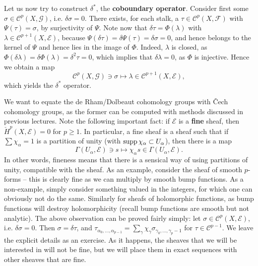 \documentclass{../mathnotes}
\begin{document}
Let us now try to construct $\delta^*$, the \textbf{coboundary operator}.
Consider first some $\sigma\in\mathcal{C}^p(X,\mathcal{G})$, i.e. $\delta\sigma=0$.
There exists, for each stalk, a $\tau\in \mathcal{C}^p(X,\mathcal{F})$ with $\Psi(\tau)=\sigma$,
by surjectivity of $\Psi$. Note now that $\delta\tau=\Phi(\lambda)$ with $\lambda\in\mathcal{C}^{p+1}(X,\mathcal{E})$,
because $\Psi(\delta\tau)=\delta\Psi(\tau)=\delta\sigma=0$, and hence belongs to the kernel of $\Psi$ and
hence lies in the image of $\Phi$. Indeed, $\lambda$ is closed, as $\Phi(\delta\lambda)=\delta\Phi(\lambda)=\delta^2\tau=0$,
which implies that $\delta\lambda=0$, as $\Phi$ is injective. Hence we obtain a map
\[\mathcal{C}^p(X,\mathcal{G})\ni\sigma\mapsto\lambda\in\mathcal{C}^{p+1}(X,\mathcal{E}),\]
which yields the $\delta^*$ operator.

We want to equate the de Rham/Dolbeaut cohomology groups with \v{C}ech cohomology groups, as the former
can be computed with methods discussed in previous lectures. Note the following important fact:
if $\mathcal{E}$ is a \textbf{fine} sheaf, then $\check H^p(X,\mathcal{E})=0$ for $p\geq 1$. In particular,
a fine sheaf is a sheaf such that if $\sum\chi_\alpha=1$ is a partition of unity (with $\operatorname{supp}\chi_\alpha\subset U_\alpha$),
then there is a map
\[\Gamma(U_\alpha,\mathcal{E})\ni s\mapsto \chi_\alpha s\in\Gamma(U_\alpha,\mathcal{E}).\]
In other words, fineness means that there is a sensical way of using partitions of unity,
compatible with the sheaf. As an example, consider the sheaf of smooth $p$-forms -- this is clearly fine
as we can multiply by smooth bump functions. As a non-example, simply consider something valued in the integers,
for which one can obviously not do the same. Similarly for sheafs of holomorphic functions, as
bump functions will destroy holomorphicity (recall bump functions are smooth but not analytic).
The above observation can be proved fairly simply: let $\sigma\in\mathcal{C}^p(X,\mathcal{E})$, i.e. $\delta\sigma=0$.
Then $\sigma=\delta\tau$, and $\tau_{\alpha_0,\ldots,\alpha_{p-1}}=\sum_\gamma\chi_\gamma\sigma_{\gamma_0,\ldots,\gamma_p-1}$
for $\tau\in\mathcal{C}^{p-1}$. We leave the explicit details as an exercise.
As it happens, the sheaves that we will be interested in will not be fine, but we will place them in exact sequences
with other sheaves that are fine.
\end{document}
